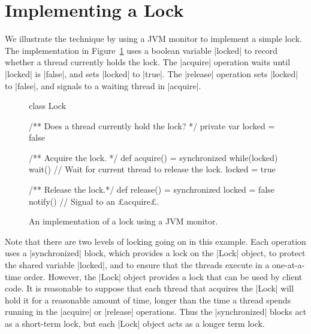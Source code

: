 

\section{Implementing a Lock}
\label{sec:jvm-lock}

We illustrate the technique by using a JVM monitor to implement a simple lock.
The implementation in Figure~\ref{fig:jvmMonitorLock} uses a boolean variable
|locked| to record whether a thread currently holds the lock.  The |acquire|
operation waits until |locked| is |false|, and sets |locked| to |true|.  The
|release| operation sets |locked| to |false|, and signals to a waiting thread
in |acquire|.


\begin{figure}
\begin{scala} 
class Lock{
  /** Does a thread currently hold the lock? */
  private var locked = false

  /** Acquire the lock. */
  def acquire() = synchronized{
    while(locked) wait() // Wait for current thread to release the lock. 
    locked = true
  }

  /** Release the lock.*/
  def release() = synchronized{
    locked = false
    notify() // Signal to an £acquire£.
  }
}
\end{scala}
\caption{An implementation of a lock using a JVM monitor.}
\label{fig:jvmMonitorLock}
\end{figure}


Note that there are two levels of locking going on in this example.  Each
operation uses a |synchronized| block, which provides a lock on the |Lock|
object, to protect the shared variable |locked|, and to ensure that the
threads execute in a one-at-a-time order.  However, the |Lock| object provides
a lock that can be used by client code.  It is reasonable to suppose that each
thread that acquires the |Lock| will hold it for a reasonable amount of time,
longer than the time a thread spends running in the |acquire| or |release|
operations.  Thus the |synchronized| blocks act as a short-term lock, but each
|Lock| object acts as a longer term lock.

